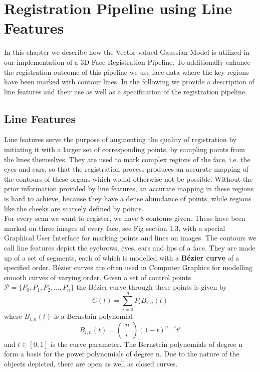 \chapter{Registration Pipeline using Line Features}
In this chapter we describe how the Vector-valued Gaussian Model is utilized in our implementation of a 3D Face Registration Pipeline. To additionally enhance the registration outcome of this pipeline we use face data where the key regions have been marked with contour lines. In the following we provide a description of line features and their use as well as a specification of the registration pipeline. 

\section{Line Features}
Line features serve the purpose of augmenting the quality of registration by initiating it with a larger set of corresponding points, by sampling points from the lines themselves. They are used to mark complex regions of the face, i.e. the eyes and ears, so that the registration process produces an accurate mapping of the contours of these organs which would otherwise not be possible. Without the prior information provided by line features, an accurate mapping in these
regions is hard to achieve, because they have a dense abundance of points, while regions like the cheeks are scarcely defined by points.\\

For every scan we want to register, we have 8 contours given. These have been marked on three images of every face, see Fig section 1.3, with a special Graphical User Interface for marking points and lines on images. The contours we call line features depict the eyebrows, eyes, ears and lips of a face. They are made up of a set of segments, each of which is modelled with a \textbf{B\'{e}zier curve} of a specified order. B\'{e}zier curves are often used in Computer
Graphics for modelling smooth curves of varying order. Given a set of control points $\mathcal{P} = \{P_{0}, P_{1}, P_{2}, \ldots, P_{n}\}$ the B\'{e}zier curve through these points is given by
\begin{equation}
    C(t)=\sum_{i=0}^{n}P_{i}B_{i,n}(t)
\end{equation}
where $B_{i,n}(t)$ is a Bernstain polynomial 
\begin{equation}
    B_{i,n}(t)=\begin{pmatrix} n \\ \\ i \end{pmatrix}(1-t)^{n-i}t^i
\end{equation}
and $t \in [0,1]$ is the curve parameter. The Bernstein polynomials of degree n form a basis for the power polynomials of degree n. 
Due to the nature of the objects depicted, there are open as well as closed curves. 

